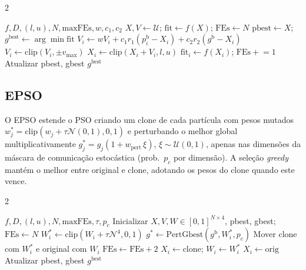 \documentclass[runningheads]{llncs}
\begin{document}
\begin{algorithm}[H]
\caption{PSO}\label{alg:pso}
\begin{multicols}{2}
\begin{algorithmic}[1]
\footnotesize
\Require $f,D,(l,u),N,\text{maxFEs},w,c_1,c_2$
\State $X,V\!\leftarrow\!\mathcal{U}$;
       $\text{fit}\!\leftarrow\!f(X)$;
       $\text{FEs}\!\leftarrow\!N$
\State $\text{pbest}\!\leftarrow\!X$;
       $g^\text{best}\!\leftarrow\!\arg\min\text{fit}$
    \State $V_i\!\leftarrow\!wV_i
           +c_1r_1(p_i^\text{b}-X_i)
           +c_2r_2(g^\text{b}-X_i)$
    \State $V_i\!\leftarrow\!\text{clip}(V_i,\pm v_\text{max})$
    \State $X_i\!\leftarrow\!\text{clip}(X_i+V_i,l,u)$
    \State $\text{fit}_i\!\leftarrow\!f(X_i)$;
           $\text{FEs}\!+\!=\!1$
    \State Atualizar pbest, gbest
  \EndFor
\EndWhile
\State \Return $g^\text{best}$
\end{algorithmic}
\end{multicols}
\end{algorithm}

\subsection{EPSO}

O EPSO estende o PSO criando um clone de cada partícula com pesos
mutados $w_j^*=\text{clip}(w_j+\tau\mathcal{N}(0,1),0,1)$ e
perturbando o melhor global multiplicativamente
$g_j^*=g_j(1+w_\text{pert}\,\xi)$, $\xi\sim\mathcal{U}(0,1)$,
apenas nas dimensões da máscara de comunicação estocástica (prob.~$p_c$
por dimensão). A seleção \emph{greedy} mantém o melhor entre original
e clone, adotando os pesos do clone quando este vence.

\begin{algorithm}[H]
\caption{EPSO}\label{alg:epso}
\begin{multicols}{2}
\begin{algorithmic}[1]
\footnotesize
\Require $f,D,(l,u),N,\text{maxFEs},\tau,p_c$
\State Inicializar $X,V,W\in[0,1]^{N\times4}$,
       pbest, gbest; $\text{FEs}\!\leftarrow\!N$
    \State $W_i^*\!\leftarrow\!\text{clip}(W_i+\tau\mathcal{N}^4,0,1)$
    \State $g^*\!\leftarrow\!\text{PertGbest}(g^\text{b},W_i^*,p_c)$
    \State Mover clone com $W_i^*$ e original com $W_i$
    \State $\text{FEs}\!\leftarrow\!\text{FEs}+2$
      \State $X_i\!\leftarrow\!\text{clone}$;
             $W_i\!\leftarrow\!W_i^*$
    \Else
      \State $X_i\!\leftarrow\!\text{orig}$
    \EndIf
    \State Atualizar pbest, gbest
  \EndFor
\EndWhile
\State \Return $g^\text{best}$
\end{algorithmic}
\end{multicols}
\end{algorithm}
\end{document}
